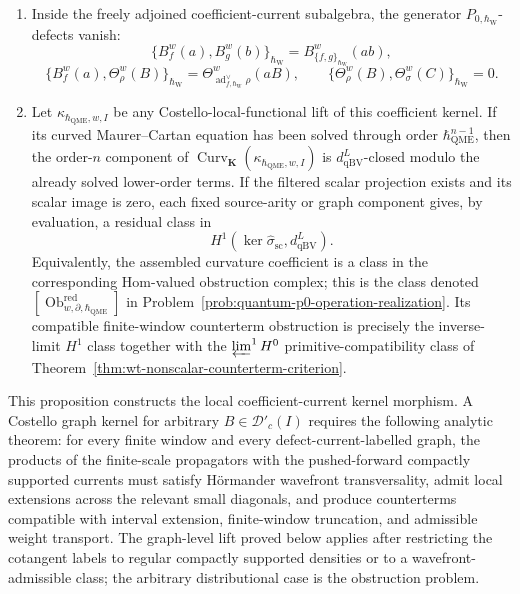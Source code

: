 \begin{prop}
\begin{enumerate}
	    applying the de Rham-current contraction, the kernel is exactly
	    \(\Phi_I^{\mathrm{cur}}\) of
	    Theorem~\ref{thm:app-factorization-universal-current-interface}.
	    \item Inside the freely adjoined coefficient-current subalgebra, the
	    generator \(P_{0,\hbar_{\mathrm{W}}}\)-defects vanish:
	    \[
	      \{B^w_f(a),B^w_g(b)\}_{\hbar_{\mathrm{W}}}
	        =B^w_{\{f,g\}_{\hbar_{\mathrm{W}}}}(ab),
	    \]
	    \[
	      \{B^w_f(a),\Theta^w_\rho(B)\}_{\hbar_{\mathrm{W}}}
	        =
	      \Theta^w_{\operatorname{ad}^{\vee}_{f,\hbar_{\mathrm{W}}}\rho}(aB),
	      \qquad
	      \{\Theta^w_\rho(B),\Theta^w_\sigma(C)\}_{\hbar_{\mathrm{W}}}=0.
	    \]
    \item Let \(\kappa_{\hbar_{\mathrm{QME}},w,I}\) be any Costello-local-functional lift
    of this coefficient kernel.  If its curved Maurer--Cartan equation has
    been solved through order \(\hbar_{\mathrm{QME}}^{n-1}\), then the order-\(n\)
    component of
    \(\operatorname{Curv}_{\mathbf K}(\kappa_{\hbar_{\mathrm{QME}},w,I})\) is
    \(d_{\mathrm{qBV}}^L\)-closed modulo the already solved lower-order
    terms.  If the filtered scalar projection exists and its scalar image
    is zero, each fixed source-arity or graph component gives, by
    evaluation, a residual class in
    \[
      H^1\!\left(\ker\widehat\sigma_{\mathrm{sc}},d_{\mathrm{qBV}}^L\right).
    \]
    Equivalently, the assembled curvature coefficient is a class in the
    corresponding Hom-valued obstruction complex; this is the class denoted
    \([\operatorname{Ob}^{\mathrm{red}}_{w,\partial,\hbar_{\mathrm{QME}}}]\) in
    Problem~\ref{prob:quantum-p0-operation-realization}.
    Its compatible finite-window counterterm obstruction is precisely the
    inverse-limit \(H^1\) class together with the
    \(\varprojlim^1H^0\) primitive-compatibility class of
    Theorem~\ref{thm:wt-nonscalar-counterterm-criterion}.
  \end{enumerate}
  This proposition constructs the local coefficient-current kernel
  morphism.  A Costello graph kernel for arbitrary
  \(B\in\mathcal D'_c(I)\) requires the following analytic theorem:
  for every finite window and every defect-current-labelled graph, the
  products of the finite-scale propagators with the pushed-forward compactly
  supported currents must satisfy H\"ormander wavefront transversality, admit
  local extensions across the relevant small diagonals, and produce
  counterterms compatible with interval extension, finite-window
  truncation, and admissible weight transport.  The graph-level lift proved
  below applies after restricting the cotangent labels to regular compactly
  supported densities or to a wavefront-admissible class; the arbitrary
  distributional case is the obstruction problem.
\end{prop}

